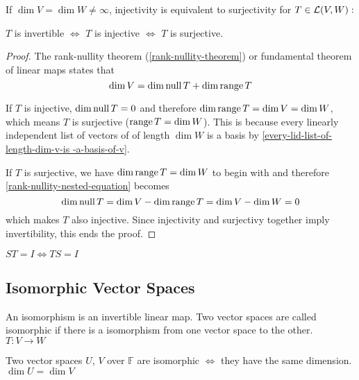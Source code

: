   \setcounter{thm}{64}
  \begin{thm}
    \label{injectivity-is-equivalent-to-surjectivity}
    If $\dim V = \dim W \neq \infty$, injectivity is equivalent to surjectivity for $T\in \mathcal{L}(V,W):$

    $T$ is invertible $\iff$ $T$ is injective $\iff$ $T$ is surjective.
  \end{thm}
  \begin{proof}
    The rank-nullity theorem (\ref{rank-nullity-theorem}) or fundamental theorem of linear maps states that
    \begin{equation}
      \label{rank-nullity-nested-equation}
      \dim V = \dim \operatorname{null} T + \dim \operatorname{range} T
    \end{equation}

    If $T$ is injective, $\dim \operatorname{null} T = 0$ and therefore $\dim \operatorname{range} T = \dim V = \dim W$, which means $T$ is surjective ($\operatorname{range} T = \dim W$). This is because every linearly independent list of vectors of of length $\dim W$ is a basis by \ref{every-lid-list-of-length-dim-v-is -a-basis-of-v}.

    If $T$ is surjective, we have $\dim \operatorname{range} T = \dim W$ to begin with and therefore \ref{rank-nullity-nested-equation} becomes
    \begin{equation}
      \dim \operatorname{null} T = \dim V - \dim \operatorname{range} T = \dim V - \dim W = 0
    \end{equation}
    which makes $T$ also injective. Since injectivity and surjectivy together imply invertibility, this ends the proof.
  \end{proof}



  \setcounter{thm}{67}
  \begin{thm}
    $ST = I \Leftrightarrow TS=I$
  \end{thm}

  \subsection{Isomorphic Vector Spaces}

  \begin{thm}
    An isomorphism is an invertible linear map. Two vector spaces are called isomorphic if there is a isomorphism from one vector space to the other. $T:V\to W$
  \end{thm}

  \begin{thm}
    Two \fd vector spaces $U$, $V$ over $\mathbb{F}$ are isomorphic $\iff$ they have the same dimension. $\dim U = \dim V$
  \end{thm}

